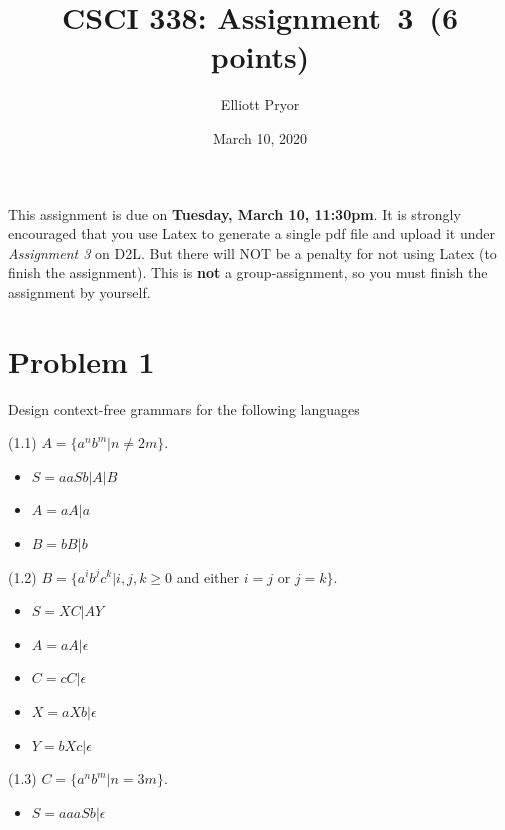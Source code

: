 \documentclass[11pt]{article}
\begin{document}
\date{March 10, 2020}
\title{CSCI 338: Assignment~3~(6 points)}

\author{Elliott Pryor}


\maketitle

\noindent
This assignment is due on {\bf Tuesday, March 10, 11:30pm}. It is strongly
encouraged that you use Latex to generate a single pdf file and upload it
under {\em Assignment 3} on D2L. But there will NOT be a penalty for not
using Latex (to finish the assignment). This is {\bf not} a group-assignment,
so you must finish the assignment by yourself.

\section*{Problem 1}

\noindent
Design context-free grammars for the following languages

(1.1) $A=\{a^nb^m|n\neq 2m\}$.

\begin{itemize}
\item $S = aaSb | A | B$
\item $A = aA | a$
\item $B = bB | b$
\end{itemize}


(1.2) $B=\{a^ib^jc^k|i,j,k\geq 0$ and either $i=j$ or $j=k\}$.

\begin{itemize}
\item $S = XC | AY$
\item $A = aA | \epsilon$
\item $C = cC | \epsilon$
\item $X = aXb | \epsilon$
\item $Y = bXc | \epsilon$

\end{itemize}

(1.3) $C=\{a^nb^m|n=3m\}$.

\begin{itemize}
\item $S = aaaSb | \epsilon$

\end{itemize}
\end{document}
